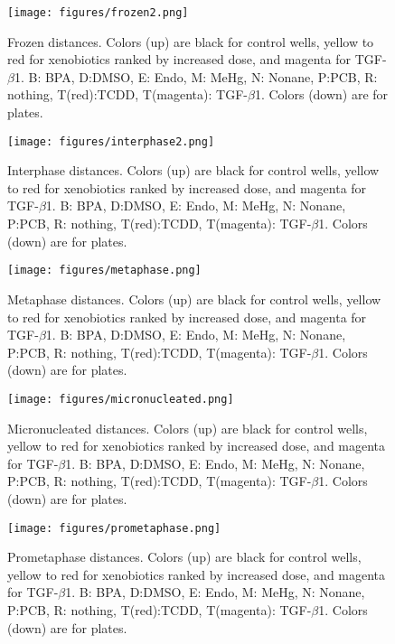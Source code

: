 \begin{figure}
\caption{Frozen distances. Colors (up) are black for control wells, yellow to red for xenobiotics ranked by increased dose, and magenta for TGF-$\beta$1. B: BPA, D:DMSO, E: Endo, M: MeHg, N: Nonane, P:PCB, R: nothing, T(red):TCDD, T(magenta): TGF-$\beta$1. Colors (down) are for plates.}
\label{frozen2}
\texttt{[image: figures/frozen2.png]}
\end{figure}
\begin{figure}
\caption{Interphase distances. Colors (up) are black for control wells, yellow to red for xenobiotics ranked by increased dose, and magenta for TGF-$\beta$1. B: BPA, D:DMSO, E: Endo, M: MeHg, N: Nonane, P:PCB, R: nothing, T(red):TCDD, T(magenta): TGF-$\beta$1. Colors (down) are for plates.}
\label{interphase2}
\texttt{[image: figures/interphase2.png]}
\end{figure}
\begin{figure}
\caption{Metaphase distances. Colors (up) are black for control wells, yellow to red for xenobiotics ranked by increased dose, and magenta for TGF-$\beta$1. B: BPA, D:DMSO, E: Endo, M: MeHg, N: Nonane, P:PCB, R: nothing, T(red):TCDD, T(magenta): TGF-$\beta$1. Colors (down) are for plates.}
\label{metaphase}
\texttt{[image: figures/metaphase.png]}
\end{figure}
\begin{figure}
\caption{Micronucleated distances. Colors (up) are black for control wells, yellow to red for xenobiotics ranked by increased dose, and magenta for TGF-$\beta$1. B: BPA, D:DMSO, E: Endo, M: MeHg, N: Nonane, P:PCB, R: nothing, T(red):TCDD, T(magenta): TGF-$\beta$1. Colors (down) are for plates.}
\label{micronucleated}
\texttt{[image: figures/micronucleated.png]}
\end{figure}

\begin{figure}
\caption{Prometaphase distances. Colors (up) are black for control wells, yellow to red for xenobiotics ranked by increased dose, and magenta for TGF-$\beta$1. B: BPA, D:DMSO, E: Endo, M: MeHg, N: Nonane, P:PCB, R: nothing, T(red):TCDD, T(magenta): TGF-$\beta$1. Colors (down) are for plates.}
\label{prometaphase}
\texttt{[image: figures/prometaphase.png]}
\end{figure}